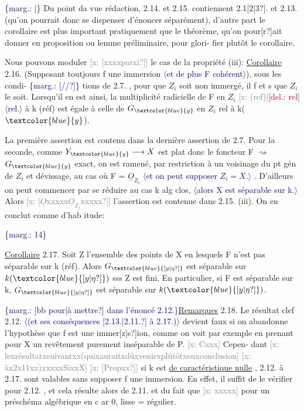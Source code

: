 \documentclass[11pt]{article}
\newcommand{\scanpage}[1]{\par\bigskip\noindent{\small\sffamily[scan #1]}\par}
\newcommand{\mspage}[1]{{\small\sffamily[p.\,#1]}}
\newcommand{\hand}[1]{\textcolor{blue}{#1}}
\newcommand{\inserted}[2][]{\textcolor{blue}{$\langle$#2$\rangle$}}
\newcommand{\margin}[1]{\textcolor{blue}{\{\textsf{marg.:} #1\}}}
\newcommand{\deleted}[1]{\textcolor{red}{[\textsf{del.:} #1]}}
\newcommand{\xout}[1]{\textcolor{gray}{[\textsf{x:} #1]}}
\newcommand{\uline}[1]{\underline{#1}}
\newcommand{\unsure}[1]{[#1?]}
\begin{document}
\margin{$|$} Du point da vue rédaction, 2.14. et 2.15.  contiennent 2.1\unsure{2|3}. et
2.13. (qu'on pourrait donc se dispenser d'énoncer séparément), d'autre
part le corollaire est plus important pratiquement que le théorème,
qu'on pour\unsure{r}ait donner en proposition ou lemme préliminaire, pour glori-%
fier plutôt le corollaire.

Nous pouvons  moduler \xout{\unsure{xxxxparxi}}  le cas de la propriété (iii):
\uline{Corollaire} 2.16.  (Supposant toutjours f une immersion \inserted{et de plus F cohérent}), sous les condi-%
\margin{\unsure{//}} tions de 2.7. , pour que $Z_i$ soit non immergé, il f et s que $Z_i$  le soit.
Lorsqu'il en est ainsi, la mu\hand{l}tiplicité radicielle de F en $Z_i$ \xout{(ref)}\deleted{rel} \inserted{rel.}
à k (réf) est égale à celle de $G_{\hand{y}}$  en $Z_i$  rel à k($\hand{y}$).

La première assertion est contenu dans la dernière assertion de
2.7. Pour la seconde, comme  $Y_{\hand{y}} \longrightarrow X$ est plat donc le foncteur F \hand{$\rightsquigarrow$} $G_{\hand{y}}$
exact,  on est ramené, par restriction à un voisinage du pt gén de $Z_i$
et dévissage, au cas où F = $\underline{O}_{Z_i}$ \inserted[typed]{et on peut supposer $Z_i = X$.} . D'ailleurs on peut commencer par
se réduire au cas k alg clos, \inserted[typed]{alors X est séparable sur k.} Alors \xout{\unsure{$\underline{O}$xxxxx$\underline{O}_{Z_i}$xxxxx}} l'assertion  est
contenue dans 2.15. (iii).   On en conclut comme d'hab itude:

\margin{14}

\clearpage
\scanpage{25/15}
\mspage{12}

\uline{Corollaire} 2.17.   Soit Z l'ensemble des points de X en lesquels F
n'est pas séparable sur k (réf). Alors  $G_{\hand{\unsure{y|\eta}}}$ est séparable sur $k(\hand{\unsure{y|\eta}})$ sss
Z est fini, En particulier, si F est séparable sur k, $G_{\hand{\unsure{y|\eta}}}$ est séparable
sur $k(\hand{\unsure{y|\eta}})$.

\margin{\unsure{bb pour|à mettre} dans l'énoncé 2.12.}\uline{Remarques} 2.18.  Le résultat clef  2.12. \inserted{(et ses conséquences \unsure{2.13.|2.11.} à 2.17.)} devient faux si on abandonne
l'hypothèse que f est une immer\unsure{z|s}ion, comme  on voit par exemple en
prenant pour  X un revêtement purement inséparable de P.  \xout{Cxxx} Cepen-%
dant \xout{lexrésultatxsuivantxx(quixauraitxdûxvenirxplûtôtxenxconclusion}
\xout{àx2x11xx)xxxxxSixxX} \xout{\unsure{Propxx}} si  k est \uline{de caractéristique nulle} ,  2.12. à
2.1\hand{7}. sont valables sans supposer f une immersion.  En effet, il suffit
de le vérifier pour 2.12. , et  cela résulte alors de 2.11. et du fait
que \xout{xxxxx} pour un préschéma algébrique en c ar 0,  lisse = régulier.
\end{document}
